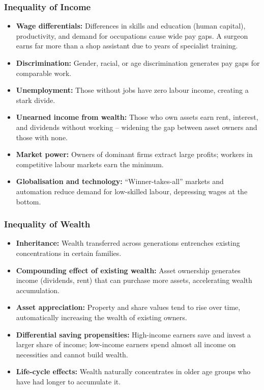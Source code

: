 \documentclass[11pt, a4paper, twoside]{book}
\begin{document}
\subsubsection{Inequality of Income}

\begin{itemize}
  \item \textbf{Wage differentials:} Differences in skills and education (human capital), productivity, and demand for occupations cause wide pay gaps. A surgeon earns far more than a shop assistant due to years of specialist training.
  \item \textbf{Discrimination:} Gender, racial, or age discrimination generates pay gaps for comparable work.
  \item \textbf{Unemployment:} Those without jobs have zero labour income, creating a stark divide.
  \item \textbf{Unearned income from wealth:} Those who own assets earn rent, interest, and dividends without working -- widening the gap between asset owners and those with none.
  \item \textbf{Market power:} Owners of dominant firms extract large profits; workers in competitive labour markets earn the minimum.
  \item \textbf{Globalisation and technology:} ``Winner-takes-all'' markets and automation reduce demand for low-skilled labour, depressing wages at the bottom.
\end{itemize}

\subsubsection{Inequality of Wealth}

\begin{itemize}
  \item \textbf{Inheritance:} Wealth transferred across generations entrenches existing concentrations in certain families.
  \item \textbf{Compounding effect of existing wealth:} Asset ownership generates income (dividends, rent) that can purchase more assets, accelerating wealth accumulation.
  \item \textbf{Asset appreciation:} Property and share values tend to rise over time, automatically increasing the wealth of existing owners.
  \item \textbf{Differential saving propensities:} High-income earners save and invest a larger share of income; low-income earners spend almost all income on necessities and cannot build wealth.
  \item \textbf{Life-cycle effects:} Wealth naturally concentrates in older age groups who have had longer to accumulate it.
\end{itemize}
\end{document}
